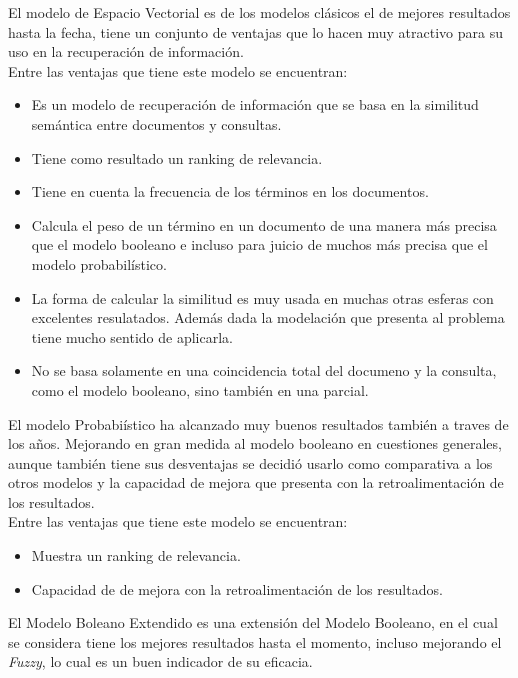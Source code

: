 \documentclass{llncs}
\begin{document}
	El modelo de Espacio Vectorial es de los modelos cl\'asicos el de mejores resultados hasta la fecha,
	tiene un conjunto de ventajas que lo hacen muy atractivo para su uso en la recuperaci\'on de informaci\'on.\\
	Entre las ventajas que tiene este modelo se encuentran:\\
	\begin{itemize}
		\item Es un modelo de recuperaci\'on de informaci\'on que se basa en la similitud sem\'antica entre documentos y consultas.
		\item Tiene como resultado un ranking de relevancia.
		\item Tiene en cuenta la frecuencia de los t\'erminos en los documentos.
		\item Calcula el peso de un t\'ermino en un documento de una manera m\'as precisa que el modelo booleano e incluso para juicio de muchos m\'as precisa que el modelo probabil\'istico.
		\item La forma de calcular la similitud es muy usada en muchas otras esferas con excelentes resulatados. Adem\'as dada la modelaci\'on que presenta al problema tiene mucho sentido de aplicarla.
		\item No se basa solamente en una coincidencia total del documeno y la consulta, como el modelo booleano, sino tambi\'en en una parcial.
	\end{itemize}

	El modelo Probabi\'istico ha alcanzado muy buenos resultados tambi\'en a traves de los a\~nos. 
	Mejorando en gran medida al modelo booleano en cuestiones generales, 
	aunque tambi\'en tiene sus desventajas se decidi\'o usarlo como comparativa a los otros modelos y la capacidad de mejora que presenta con la 
	retroalimentaci\'on de los resultados.\\

	Entre las ventajas que tiene este modelo se encuentran:\\
	\begin{itemize}
		\item Muestra un ranking de relevancia.
		\item Capacidad de de mejora con la retroalimentaci\'on de los resultados.
	\end{itemize}
    
	El Modelo Boleano Extendido es una extensi\'on del Modelo Booleano, en el cual se considera tiene
	los mejores resultados hasta el momento, incluso mejorando el \textit{Fuzzy}, lo cual es un buen indicador de su eficacia.\\
\end{document}
